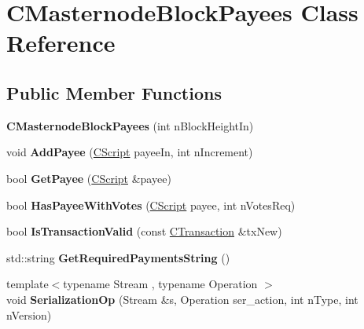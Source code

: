 \hypertarget{class_c_masternode_block_payees}{}\section{C\+Masternode\+Block\+Payees Class Reference}
\label{class_c_masternode_block_payees}
\subsection*{Public Member Functions}
\begin{DoxyCompactItemize}
\item 
\mbox{\label{class_c_masternode_block_payees_a0b181e78ae9b160c146bc9e8d12d44b5}} 
{\bfseries C\+Masternode\+Block\+Payees} (int n\+Block\+Height\+In)
\item 
\mbox{\label{class_c_masternode_block_payees_a8bd8569ccbd580a73efcabb713b89424}} 
void {\bfseries Add\+Payee} (\mbox{\hyperlink{class_c_script}{C\+Script}} payee\+In, int n\+Increment)
\item 
\mbox{\label{class_c_masternode_block_payees_a07324946c249f7a16488e2b0a7495971}} 
bool {\bfseries Get\+Payee} (\mbox{\hyperlink{class_c_script}{C\+Script}} \&payee)
\item 
\mbox{\label{class_c_masternode_block_payees_a06a48f4df1a48481dbec3cb8d3e21ba9}} 
bool {\bfseries Has\+Payee\+With\+Votes} (\mbox{\hyperlink{class_c_script}{C\+Script}} payee, int n\+Votes\+Req)
\item 
\mbox{\label{class_c_masternode_block_payees_a6721f357d17e653ceb93c28ffd3ae528}} 
bool {\bfseries Is\+Transaction\+Valid} (const \mbox{\hyperlink{class_c_transaction}{C\+Transaction}} \&tx\+New)
\item 
\mbox{\label{class_c_masternode_block_payees_a1026e555a9484567ea6cbfe8f90b428e}} 
std\+::string {\bfseries Get\+Required\+Payments\+String} ()
\item 
\mbox{\label{class_c_masternode_block_payees_a482b77d8b758b21b4e6b0c8a0ef7a09f}} 
{\footnotesize template$<$typename Stream , typename Operation $>$ }\\void {\bfseries Serialization\+Op} (Stream \&s, Operation ser\+\_\+action, int n\+Type, int n\+Version)
\end{DoxyCompactItemize}
